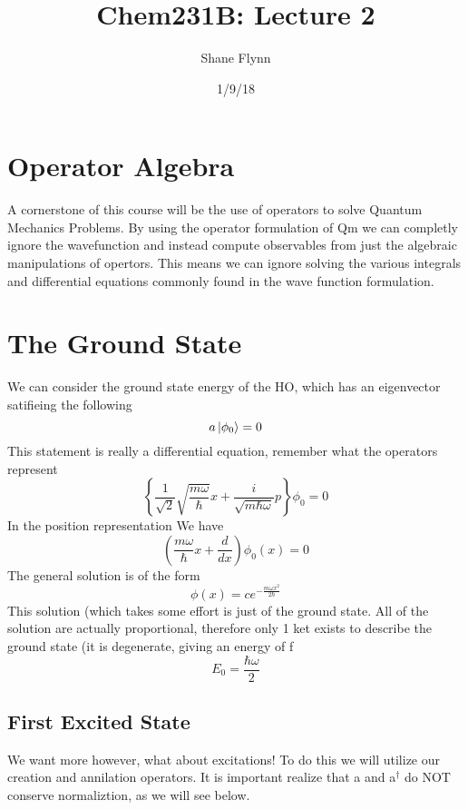 \documentclass{article}
\title{Chem231B: Lecture 2}
\author{Shane Flynn}
\date{1/9/18}
\newcommand{\be}{\begin{equation}}
\newcommand{\ee}{\end{equation}}
\newcommand{\dg}{\dagger}
\begin{document}
\maketitle

\section*{Operator Algebra}
A cornerstone of this course will be the use of operators to solve Quantum Mechanics Problems. 
By using the operator formulation of Qm we can completly ignore the wavefunction and instead compute observables from just the algebraic manipulations of opertors.
This means we can ignore solving the various integrals and differential equations commonly found in the wave function formulation. 

\section*{The Ground State}
We can consider the ground state energy of the HO, which has an eigenvector satifieing the following
\be
a\ket{\phi_0} = 0
\ee
This statement is really a differential equation, remember what the operators represent
\be
\left\{\frac{1}{\sqrt{2}} \sqrt{\frac{m\omega}{\hbar}}x + \frac{i}{\sqrt{m\hbar\omega}}p\right\}\phi_0 = 0
\ee
In the position representation 
We have 
\be
\left(\frac{m\omega}{\hbar}x + \frac{d}{dx}\right)\phi_0(x) = 0
\ee
The general solution is of the form 
\be
\phi(x) = ce^{-\frac{m\omega x^2}{2\hbar}}
\ee
This solution (which takes some effort is just of the ground state.
All of the solution are actually proportional, therefore only 1 ket exists to describe the ground state (it is degenerate, giving an energy of f
\be
E_0 = \frac{\hbar\omega}{2}
\ee
\subsection*{First Excited State}
We want more however, what about excitations!
To do this we will utilize our creation and annilation operators.
It is important realize that a and a$^\dg$ do NOT conserve normaliztion, as we will see below.
\end{document}
